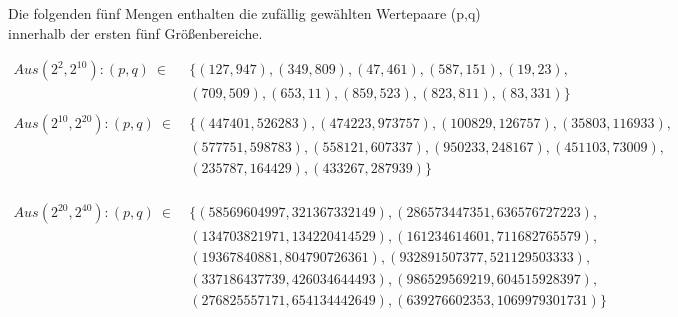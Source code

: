 \begin{refsegment}
\noindent Die folgenden fünf Mengen enthalten die zufällig gewählten Wertepaare (p,q) innerhalb
der ersten fünf Größenbereiche.

\begin{equation*}
  \begin{split}
Aus (2^2, 2^{10}): (p,q)~\in~ & \{ (127,947),(349,809),(47,461),(587,151),(19,23),\\
                              & (709,509),(653,11),(859,523),(823,811),(83,331)\}\\
\\
Aus (2^{10}, 2^{20}): (p,q)~\in~
            & \{ (447401,526283),(474223,973757),(100829,126757),(35803,116933),\\
            &    (577751,598783),(558121,607337),(950233,248167),(451103,73009),\\
            &    (235787,164429),(433267,287939)\}\\
  \end{split}
\end{equation*}

\begin{equation*}
  \begin{split}
Aus (2^{20},2^{40}): (p,q)~\in~
            & \{ (58569604997,321367332149),(286573447351,636576727223),\\
            &    (134703821971,134220414529),(161234614601,711682765579),\\
            &    (19367840881, 804790726361),(932891507377,521129503333),\\
            &    (337186437739,426034644493),(986529569219,604515928397),\\
            &    (276825557171,654134442649),(639276602353,1069979301731) \}\\
  \end{split}
\end{equation*}


\end{refsegment}

